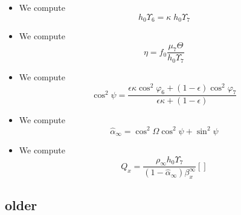 \documentclass[aps,onecolumn,10pt]{revtex4}
\begin{document}
\begin{itemize}
\item We compute
\begin{equation}
	h_0 \Upsilon_6 = \kappa \; h_0 \Upsilon_7
\end{equation}

\item We compute
$$
	\eta = f_0 \dfrac{\mu_7 \Theta}{h_0\Upsilon_7}
$$

\item We compute
$$
	\cos^2\psi = \dfrac{\epsilon\kappa\cos^2\varphi_6+(1-\epsilon)\cos^2\varphi_7}{\epsilon\kappa+(1-\epsilon)} 
$$

\item We compute
$$
	\hat\alpha_\infty = \cos^2\Omega\cos^2\psi + \sin^2\psi
$$

\item We compute
$$
	Q_x = \dfrac{\rho_\infty h_0 \Upsilon_7}{(1-\hat\alpha_\infty)\beta_x^\infty} \left[ \right]
$$

\end{itemize}

\subsection{older}

\color{blue}
\end{document}

